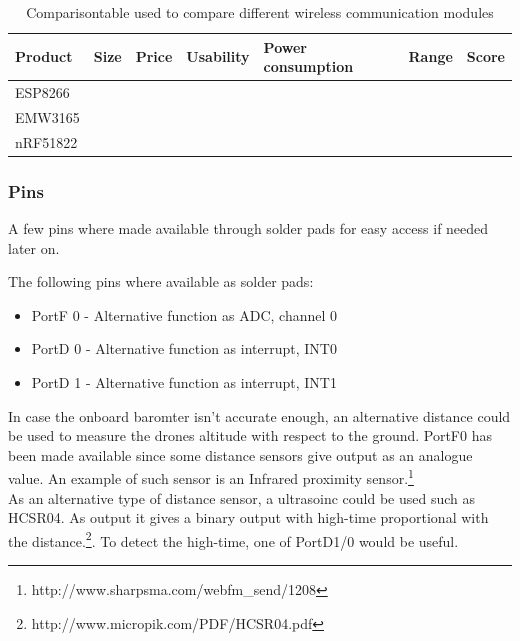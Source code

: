 \begin{table}[H]
	\centering
	\begin{tabular}{@{}|l|l|l|l|l|l|l|@{}}
		\toprule
		\textbf{Product} & \textbf{Size} & \textbf{Price} & 				\textbf{Usability} & \textbf{Power consumption} & 					\textbf{Range} & \textbf{Score} \\ \midrule
		ESP8266          &               &                &                    		&                            &                &                		\\ \midrule
		EMW3165          &               &                &                    		&                            &                &                		\\ \midrule
		nRF51822         &               &                &                    		&                            &                &                		\\ \bottomrule
	\end{tabular}
	\caption{Comparisontable used to compare different wireless 		communication modules}
	\label{tab:compare_table_wireless_communication}
\end{table}

\subsubsection{Pins}
A few pins where made available through solder pads for easy access if needed later on.

The following pins where available as solder pads:
\begin{itemize}
	\item PortF 0 - Alternative function as ADC, channel 0
	\item PortD 0 - Alternative function as interrupt, INT0
	\item PortD 1 - Alternative function as interrupt, INT1
\end{itemize}
In case the onboard baromter isn't accurate enough, an alternative distance could be used to measure the drones altitude with respect to the ground.
PortF0 has been made available since some distance sensors give output as an analogue value. 
An example of such sensor is an Infrared proximity sensor.\footnote{http://www.sharpsma.com/webfm\_send/1208} \\
As an alternative type of distance sensor, a ultrasoinc could be used such as HCSR04.
As output it gives a binary output with high-time proportional with the distance.\footnote{http://www.micropik.com/PDF/HCSR04.pdf}.
To detect the high-time, one of PortD1/0 would be useful. \\


